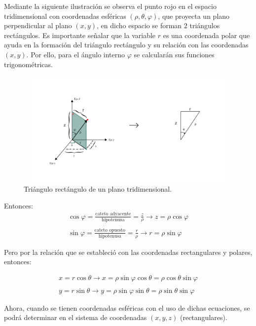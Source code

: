 Mediante la siguiente ilustración se observa el punto rojo en el espacio tridimensional con coordenadas esféricas ${\left(\rho,\theta,\varphi\right)}$, que proyecta un plano perpendicular al plano ${\left(x,y\right)}$, en dicho espacio se forman ${2}$ triángulos rectángulos. Es importante señalar que la variable ${r}$ es una coordenada polar que ayuda en la formación del triángulo rectángulo y su relación con las coordenadas ${\left(x,y\right)}$. Por ello, para el ángulo interno ${\varphi}$ se calcularán sus funciones trigonométricas.

\begin{figure}[H]
  \centering
  \includegraphics[width=11.17cm, height=5.67cm]{img/graph/coord_esf_2_rect_1.jpg}
  \caption{Triángulo rectángulo de un plano tridimensional.}
  \label{relacion_de_coordenadas}
\end{figure}

Entonces:
\begin{eqnarray*}
  \cos \varphi = \frac{\text{cateto adyacente}}{\text{hipotenusa}} = \frac{z}{\rho} \rightarrow z = \rho \cos \varphi\\\\
  \sin \varphi = \frac{\text{cateto opuesto}}{\text{hipotenusa}} = \frac{r}{\rho} \rightarrow r = \rho \sin \varphi
\end{eqnarray*}

\vspace{4mm}
Pero por la relación que se estableció con las coordenadas rectangulares y polares, entonces:

\begin{eqnarray*}
  x = r \cos \theta \rightarrow x = \rho \sin \varphi \cos \theta = \rho \cos \theta \sin \varphi\\\\
  y = r \sin \theta \rightarrow y = \rho \sin \varphi \sin \theta = \rho \sin \theta \sin \varphi
\end{eqnarray*}

\vspace{4mm}
Ahora, cuando se tienen coordenadas esféricas con el uso de dichas ecuaciones, se podrá determinar en el sistema de coordenadas $(x,y,z)$ (rectangulares).
